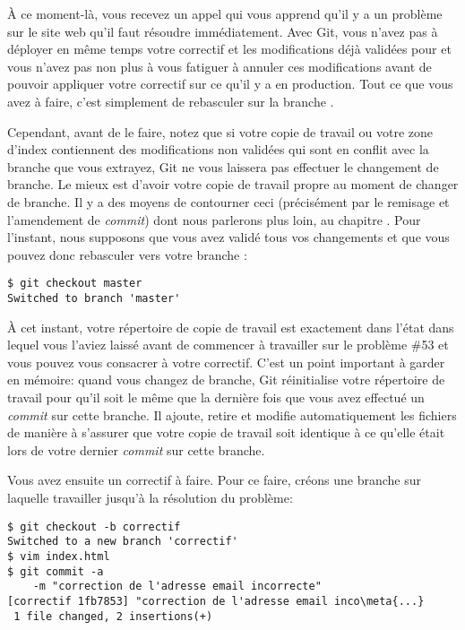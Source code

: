 À ce moment-là, vous recevez un appel qui vous apprend qu'il y a un problème sur le site web qu'il faut résoudre immédiatement.
Avec Git, vous n'avez pas à déployer en même temps votre correctif et les modifications déjà validées pour  et vous n'avez pas non plus à vous fatiguer à annuler ces modifications avant de pouvoir appliquer votre correctif sur ce qu'il y a en production.
Tout ce que vous avez à faire, c'est simplement de rebasculer sur la branche .

Cependant, avant de le faire, notez que si votre copie de travail ou votre zone d'index contiennent des modifications non validées qui sont en conflit avec la branche que vous extrayez, Git ne vous laissera pas effectuer le changement de branche.
Le mieux est d'avoir votre copie de travail propre au moment de changer de branche.
Il y a des moyens de contourner ceci (précisément par le remisage et l'amendement de \emph{commit}) dont nous parlerons plus loin, au chapitre .
Pour l'instant, nous supposons que vous avez validé tous vos changements et que vous pouvez donc rebasculer vers votre branche :
\begin{Schunk}
\begin{Verbatim}
$ git checkout master
Switched to branch 'master'
\end{Verbatim}
\end{Schunk}

À cet instant, votre répertoire de copie de travail est exactement dans l'état dans lequel vous l'aviez laissé avant de commencer à travailler sur le problème \#53 et vous pouvez vous consacrer à votre correctif.
C'est un point important à garder en mémoire: quand vous changez de branche, Git réinitialise votre répertoire de travail pour qu'il soit le même que la dernière fois que vous avez effectué un \emph{commit} sur cette branche.
Il ajoute, retire et modifie automatiquement les fichiers de manière à s'assurer que votre copie de travail soit identique à ce qu'elle était lors de votre dernier \emph{commit} sur cette branche.

Vous avez ensuite un correctif à faire.
Pour ce faire, créons une branche  sur laquelle travailler jusqu'à la résolution du problème:
\begin{Schunk}
\begin{Verbatim}[commandchars=\\\{\}]
$ git checkout -b correctif
Switched to a new branch 'correctif'
$ vim index.html
$ git commit -a
    -m "correction de l'adresse email incorrecte"
[correctif 1fb7853] "correction de l'adresse email inco\meta{...}
 1 file changed, 2 insertions(+)
\end{Verbatim}
\end{Schunk}

